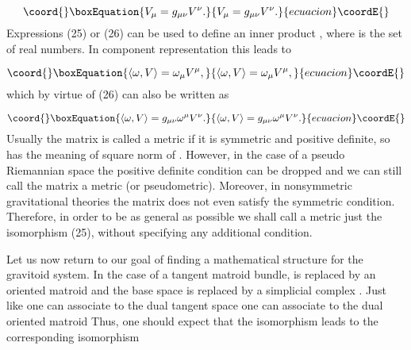 \documentclass[a4paper,12pt]{article}
\begin{document}
\begin{equation}\coord{}\boxEquation{
V_{\mu }=g_{\mu \nu }V^{\nu }.  \label{26}
}{
V_{\mu }=g_{\mu \nu }V^{\nu }.  }{ecuacion}\coordE{}\end{equation}
Expressions (25) or (26) can be used to define an inner product \coordHE{}, where \coordHE{}
is the set of real numbers. In component representation this leads to

\begin{equation}\coord{}\boxEquation{
\langle \omega ,V\rangle =\omega _{\mu }V^{\mu },  \label{27}
}{
\langle \omega ,V\rangle =\omega _{\mu }V^{\mu },  }{ecuacion}\coordE{}\end{equation}
which by virtue of (26) can also be written as

\begin{equation}\coord{}\boxEquation{
\langle \omega ,V\rangle =g_{\mu \nu }\omega ^{\mu }V^{\nu }.  \label{28}
}{
\langle \omega ,V\rangle =g_{\mu \nu }\omega ^{\mu }V^{\nu }.  }{ecuacion}\coordE{}\end{equation}
Usually the matrix \coordHE{} is called a metric if it is symmetric and
positive definite, so \coordHE{} has the meaning of square norm
of \coordHE{}. However, in the case of a pseudo Riemannian space the positive
definite condition can be dropped and we can still call the matrix \coordHE{} a metric (or pseudometric). Moreover, in nonsymmetric gravitational
theories the matrix \coordHE{} does not even satisfy the symmetric
condition. Therefore, in order to be as general as possible we shall call a
metric just the isomorphism (25), without specifying any additional
condition.

Let us now return to our goal of finding a mathematical structure for the
gravitoid system. In the case of a tangent matroid bundle, \coordHE{} is
replaced by an oriented matroid \coordHE{} and the base space is
replaced by a simplicial complex \coordHE{}. Just like one can associate to \coordHE{} the dual tangent space \coordHE{} one can associate to \coordHE{} the dual oriented matroid \coordHE{}
Thus, one should expect that the isomorphism \coordHE{} leads to the corresponding isomorphism
\end{document}
